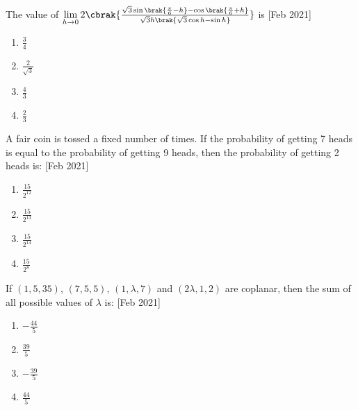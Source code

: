 \iffalse
\title{2021}
\author{AI24BTECH11031}
\section{mcq-single}
\fi

\item The value of $\lim\limits_{h \to 0} 2\cbrak{\frac{\sqrt{3}\sin\brak{\frac{\pi}{6} - h} - \cos\brak{\frac{\pi}{6} + h}}{\sqrt{3}h\brak{\sqrt{3}\cos h - \sin h}}}$ is
\hfill{[Feb 2021]}

\begin{multicols}{4}
\begin{enumerate}
    \item $\frac{3}{4}$
    \item $\frac{2}{\sqrt{3}}$
    \item $\frac{4}{3}$
    \item $\frac{2}{3}$
\end{enumerate}
\end{multicols}

\item A fair coin is tossed a fixed number of times. If the probability of
getting 7 heads is equal to the probability of getting 9 heads, then the
probability of getting 2 heads is:
\hfill{[Feb 2021]}

\begin{multicols}{4}
\begin{enumerate}
    \item $\frac{15}{2^{12}}$
    \item $\frac{15}{2^{13}}$
    \item $\frac{15}{2^{14}}$
    \item $\frac{15}{2^{8}}$
\end{enumerate}
\end{multicols}

\item If $(1, 5, 35)$, $(7, 5, 5)$, $(1, \lambda, 7)$ and $(2\lambda, 1, 2)$ are
coplanar, then the sum of all possible values of $\lambda$ is:
\hfill{[Feb 2021]}

\begin{multicols}{4}
\begin{enumerate}
    \item $-\frac{44}{5}$
    \item $\frac{39}{5}$
    \item $-\frac{39}{5}$
    \item $\frac{44}{5}$
\end{enumerate}
\end{multicols}

